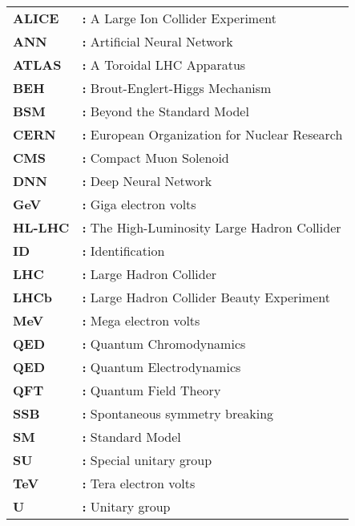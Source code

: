 \begin{tabular}{@{}p{2cm}l}
{\bf ALICE} & {\bf:} A Large Ion Collider Experiment\\
{\bf ANN} & {\bf:} Artificial Neural Network\\
{\bf ATLAS} & {\bf:} A Toroidal LHC Apparatus\\
{\bf BEH} & {\bf:} Brout-Englert-Higgs Mechanism\\
{\bf BSM} & {\bf:} Beyond the Standard Model\\
{\bf CERN} & {\bf:} European Organization for Nuclear Research\\
{\bf CMS} & {\bf:} Compact Muon Solenoid\\
{\bf DNN} & {\bf:} Deep Neural Network\\
{\bf GeV} & {\bf:} Giga electron volts\\
{\bf HL-LHC} & {\bf:} The High-Luminosity Large Hadron Collider\\
{\bf ID} & {\bf:} Identification\\
{\bf LHC} & {\bf:} Large Hadron Collider\\
{\bf LHCb} & {\bf:} Large Hadron Collider Beauty Experiment\\
{\bf MeV} & {\bf:} Mega electron volts\\
{\bf QED} & {\bf:} Quantum Chromodynamics\\
{\bf QED} & {\bf:} Quantum Electrodynamics\\
{\bf QFT} & {\bf:} Quantum Field Theory\\
{\bf SSB} & {\bf:} Spontaneous symmetry breaking\\
{\bf SM} & {\bf:} Standard Model\\
{\bf SU} & {\bf:} Special unitary group\\
{\bf TeV} & {\bf:} Tera electron volts\\
{\bf U} & {\bf:} Unitary group\\
\end{tabular}

